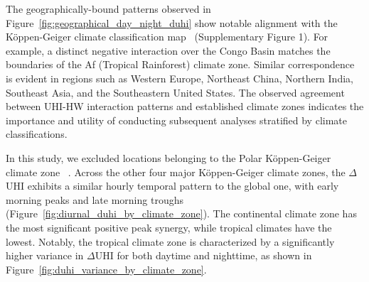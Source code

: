 \bgroup
{}
\begin{figure*}[!htbp]
\centering \makeatletter{}
\makeatother 
\caption{{\textbf{Nighttime \ensuremath{\Delta }UHI is stronger than that of Daytime.} Geographical distributions of \ensuremath{\Delta }UHI during daytime (a) and nighttime (b). }}
\label{fig:geographical_day_night_duhi}
\end{figure*}
\egroup

\bgroup
{}
\begin{figure*}[!htbp]
\centering \makeatletter{}
\makeatother 
\caption{{K{\"{o}}ppen{\textendash}Geiger climate map 1991{\textendash}2020\unskip~\protect\cite{2755510:33598889}}}
\label{fig:koppen_geiger_map}
\end{figure*}
\egroup
The geographically-bound patterns observed in Figure~\ref{fig:geographical_day_night_duhi}  show notable alignment with the K{\"{o}}ppen-Geiger climate classification map\unskip~\cite{2755510:33598889}  (Supplementary Figure 1). For example, a distinct negative interaction over the Congo Basin matches the boundaries of the Af (Tropical Rainforest) climate zone. Similar correspondence is evident in regions such as Western Europe, Northeast China, Northern India, Southeast Asia, and the Southeastern United States. The observed agreement between UHI-HW interaction patterns and established climate zones indicates the importance and utility of conducting subsequent analyses stratified by climate classifications.

In this study, we excluded locations belonging to the Polar K{\"{o}}ppen-Geiger climate zone\unskip~\cite{2755510:33598889} . Across the other four major K{\"{o}}ppen-Geiger climate zones, the \ensuremath{\Delta }UHI exhibits a similar hourly temporal pattern to the global one, with early morning peaks and late morning troughs (Figure~\ref{fig:diurnal_duhi_by_climate_zone}). The continental climate zone has the most significant positive peak synergy, while tropical climates have the lowest. Notably, the tropical climate zone is characterized by a significantly higher variance in \ensuremath{\Delta }UHI for both daytime and nighttime, as shown in Figure~\ref{fig:duhi_variance_by_climate_zone}.


